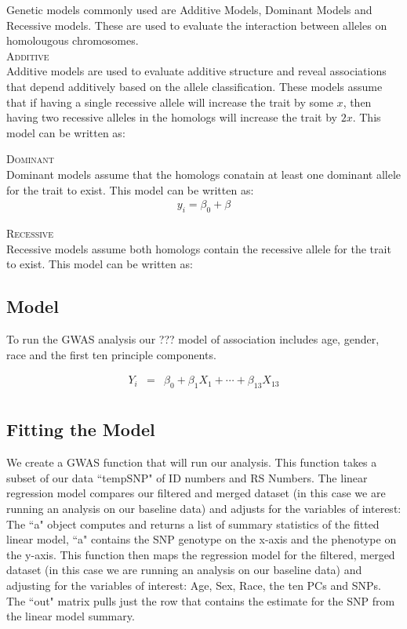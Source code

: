 \documentclass{ar2e}
\begin{document}
Genetic models commonly used are Additive Models, Dominant Models and Recessive models. These are used to evaluate the interaction between alleles on homolougous chromosomes. \\

\textsc{Additive}\\
Additive models are used to evaluate additive structure and reveal associations that depend additively based on the allele classification. These models assume that if having a single recessive allele will increase the trait by some $x$, then having two recessive alleles in the homologs will increase the trait by $2x$. This model can be written as:

\textsc{Dominant}\\
Dominant models assume that the homologs conatain at least one dominant allele for the trait to exist. This model can be written as:
\begin{eqnarray}
y_{i} = \beta_0 + \beta
\end{eqnarray}

\textsc{Recessive}\\
Recessive models assume both homologs contain the recessive allele for the trait to exist. This model can be written as:

\subsection{Model}

To run the GWAS analysis our ??? model of association includes age, gender, race and the first ten principle components.

\begin{eqnarray}
Y_i &=& \beta_0 + \beta_1 X_1 + \cdots + \beta_{13} X_{13} \\
\end{eqnarray}

\subsection{Fitting the Model}

We create a GWAS function that will run our analysis. This function takes a subset of our data ``tempSNP" of ID numbers and RS Numbers. The linear regression model compares our filtered and merged dataset (in this case we are running an analysis on our baseline data) and adjusts for the variables of interest: 
The ``a" object computes and returns a list of summary statistics of the fitted linear model, ``a" contains the SNP genotype on the x-axis and the phenotype on the y-axis. This function then maps the regression model for the filtered, merged dataset (in this case we are running an analysis on our baseline data) and adjusting for the variables of interest: Age, Sex, Race, the ten PCs and SNPs. The ``out" matrix pulls just the row that contains the estimate for the SNP from the linear model summary.
\end{document}
